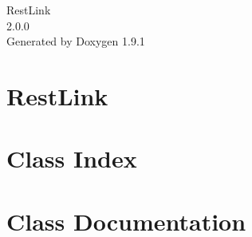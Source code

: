 \let\mypdfximage\pdfximage\def\pdfximage{\immediate\mypdfximage}\documentclass[twoside]{book}
\newcommand{\+}{\discretionary{\mbox{\scriptsize$\hookleftarrow$}}{}{}}
\newcommand{\clearemptydoublepage}{%
  \newpage{\pagestyle{empty}\cleardoublepage}%
}
\begin{document}
\raggedbottom

\hypersetup{pageanchor=false,
             bookmarksnumbered=true,
             pdfencoding=unicode
            }
\begin{titlepage}
\vspace*{7cm}
\begin{center}%
{\Large Rest\+Link \\[1ex]\large 2.\+0.\+0 }\\
\vspace*{1cm}
{\large Generated by Doxygen 1.9.1}\\
\end{center}
\end{titlepage}
\clearemptydoublepage
{}
\tableofcontents
\clearemptydoublepage
{}
\hypersetup{pageanchor=true}

\chapter{Rest\+Link}
\label{index}\hypertarget{index}{}
\chapter{Class Index}

\chapter{Class Documentation}




\backmatter
\newpage
{}
\clearemptydoublepage
{}
\printindex
\end{document}
